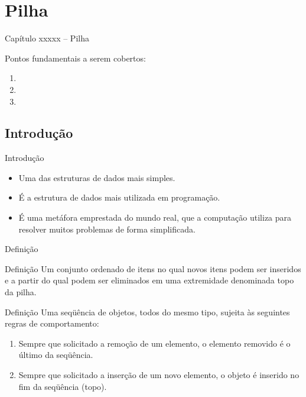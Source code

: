 

\section{Pilha}

\begin{frame}
\begin{center}
{\Large Capítulo xxxxx -- Pilha}

Pontos fundamentais a serem cobertos:

\begin{enumerate}
  \item 
  \item 
  \item 
\end{enumerate}

\end{center}

\end{frame}



\subsection{Introdução} 

  \begin{frame}{Introdução}    
		\begin{itemize}
			\item Uma das estruturas de dados mais simples.
			\item É a estrutura de dados mais utilizada em programação.
			\item É uma metáfora emprestada do mundo real, que a computação utiliza para resolver muitos problemas de forma simplificada.
		\end{itemize}
  \end{frame}
  
   \begin{frame}{Definição}
     \begin{block}{Definição}
       Um conjunto ordenado de itens no qual novos itens podem ser inseridos e a partir do qual podem ser eliminados em uma extremidade denominada \alert{topo} da pilha.
     \end{block}
     \pause
     \begin{block}{Definição}
       Uma seqüência de objetos, todos do mesmo tipo, sujeita às seguintes regras de comportamento:       
				\begin{enumerate}
					\item Sempre que solicitado a remoção de um elemento, o elemento removido é o último da seqüência.
					\item Sempre que solicitado a inserção de um novo elemento, o objeto é inserido no fim da seqüência (\alert{topo}).
				\end{enumerate}
     \end{block}  
   \end{frame}
  
